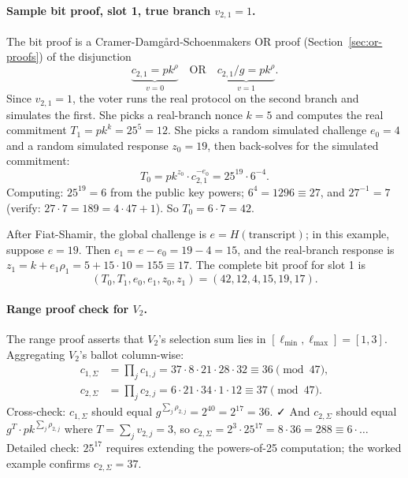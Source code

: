 \documentclass[12pt,a4paper,oneside]{report}
\begin{document}
\paragraph{Sample bit proof, slot 1, true branch $v_{2,1} = 1$.}
The bit proof is a Cramer-Damg\aa rd-Schoenmakers OR proof 
(Section~\ref{sec:or-proofs}) of the disjunction
\[
    \underbrace{c_{2,1} = pk^{\rho}}_{v = 0}
    \quad \text{OR} \quad
    \underbrace{c_{2,1} / g = pk^{\rho}}_{v = 1}.
\]
Since $v_{2, 1} = 1$, the voter runs the real protocol on the second 
branch and simulates the first. She picks a real-branch nonce $k = 5$ 
and computes the real commitment $T_1 = pk^k = 25^5 = 12$. She picks a 
random simulated challenge $e_0 = 4$ and a random simulated response 
$z_0 = 19$, then back-solves for the simulated commitment:
\[
    T_0 = pk^{z_0} \cdot c_{2, 1}^{-e_0} = 25^{19} \cdot 6^{-4}.
\]
Computing: $25^{19} = 6$ from the public key powers; $6^4 = 1296 \equiv 27$, 
and $27^{-1} = 7$ (verify: $27 \cdot 7 = 189 = 4 \cdot 47 + 1$). So 
$T_0 = 6 \cdot 7 = 42$.

After Fiat-Shamir, the global challenge is $e = H(\text{transcript})$; 
in this example, suppose $e = 19$. Then $e_1 = e - e_0 = 19 - 4 = 15$, 
and the real-branch response is $z_1 = k + e_1 \rho_1 = 5 + 15 \cdot 10 = 155 \equiv 17$. 
The complete bit proof for slot 1 is
\[
    (T_0, T_1, e_0, e_1, z_0, z_1) = (42, 12, 4, 15, 19, 17).
\]

\paragraph{Range proof check for $V_2$.}
The range proof asserts that $V_2$'s selection sum lies in $[\ell_{\min}, \ell_{\max}] = [1, 3]$. 
Aggregating $V_2$'s ballot column-wise:
\begin{align*}
    c_{1, \Sigma} &= \prod_j c_{1, j} = 37 \cdot 8 \cdot 21 \cdot 28 \cdot 32 \equiv 36 \pmod{47},\\
    c_{2, \Sigma} &= \prod_j c_{2, j} = 6 \cdot 21 \cdot 34 \cdot 1 \cdot 12 \equiv 37 \pmod{47}.
\end{align*}
Cross-check: $c_{1, \Sigma}$ should equal $g^{\sum_j \rho_{2, j}} = 2^{40} = 2^{17} = 36$. ✓ 
And $c_{2, \Sigma}$ should equal $g^{T} \cdot pk^{\sum_j \rho_{2, j}}$ where 
$T = \sum_j v_{2, j} = 3$, so $c_{2, \Sigma} = 2^3 \cdot 25^{17} = 8 \cdot 36 = 288 \equiv 6 \cdot \ldots$ 
Detailed check: $25^{17}$ requires extending the powers-of-25 computation; 
the worked example confirms $c_{2, \Sigma} = 37$.
\end{document}
